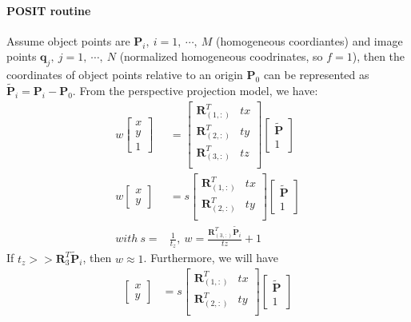 \documentclass[a4paper]{article}
\begin{document}
\paragraph{POSIT routine}
Assume object points are  $\mathbf{P}_i,\ i=1,\ \cdots,\ M$ (homogeneous coordiantes) and image points $\mathbf{q}_j,\ j=1,\ \cdots,\ N$ (normalized homogeneous coodrinates, so $f=1$), then the coordinates of object points relative to an origin $\mathbf{P}_0$ can be represented as $\tilde{\mathbf{P}}_i=\mathbf{P}_i-\mathbf{P}_0$. From the perspective projection model, we have:
\begin{align*}
w\left[
\begin{matrix}
x \\ y \\ 1
\end{matrix}\right]&=\left[
\begin{matrix}
\mathbf{R}_{(1,:)}^T & tx \\ 
\mathbf{R}_{(2,:)}^T & ty \\ 
\mathbf{R}_{(3,:)}^T & tz \\ 
\end{matrix}
\right]
\left[
\begin{matrix}
\tilde{\mathbf{P}} \\ 1
\end{matrix}
\right] \\
w\left[
\begin{matrix}
x \\ y 
\end{matrix}\right]&=s
\left[
\begin{matrix}
\mathbf{R}_{(1,:)}^T & tx \\ 
\mathbf{R}_{(2,:)}^T & ty \\ 
\end{matrix}
\right]
\left[
\begin{matrix}
\tilde{\mathbf{P}} \\ 1
\end{matrix}
\right] \\
with\ s=&\frac{1}{t_z},\ w=\frac{\mathbf{R}_{(3,:)}^T\tilde{\mathbf{P}}_i}{tz}+1
\end{align*}
If $t_z >> \mathbf{R}_3^T\tilde{\mathbf{P}}_i$, then $w \approx 1$. Furthermore, we will have 
\begin{align*}
\left[
\begin{matrix}
x \\ y 
\end{matrix}\right]&=s
\left[
\begin{matrix}
\mathbf{R}_{(1,:)}^T & tx \\ 
\mathbf{R}_{(2,:)}^T & ty \\ 
\end{matrix}
\right]
\left[
\begin{matrix}
\tilde{\mathbf{P}} \\ 1
\end{matrix}
\right]
\end{align*}
\end{document}
